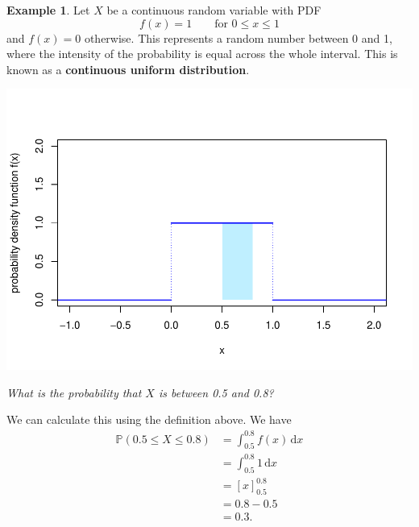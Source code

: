 \documentclass[
  a4paper,
]{book}
\theoremstyle{definition}
\theoremstyle{definition}
\newtheorem{example}{Example}[chapter]
\theoremstyle{definition}
\theoremstyle{definition}
\theoremstyle{remark}
\begin{document}
\begin{example}
Let \(X\) be a continuous random variable with PDF
\[  f(x) = 1 \qquad \text{for $0 \leq x \leq 1$} \]
and \(f(x) = 0\) otherwise. This represents a random number between 0 and 1, where the intensity of the probability is equal across the whole interval. This is known as a \textbf{continuous uniform distribution}.

\includegraphics{math1710_files/figure-latex/contunif-pdf-1.pdf}

\emph{What is the probability that \(X\) is between 0.5 and 0.8?}

We can calculate this using the definition above. We have
\begin{align*}
  \mathbb P(0.5 \leq X \leq 0.8) &= \int_{0.5}^{0.8} f(x) \, \mathrm dx \\
    &= \int_{0.5}^{0.8} 1 \, \mathrm dx \\
    &= [x]_{0.5}^{0.8} \\
    &= 0.8 - 0.5 \\
    &= 0.3 .
\end{align*}
\end{example}
\end{document}
